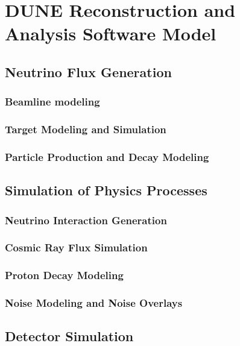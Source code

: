 %
\chapter{DUNE Reconstruction and Analysis Software Model } 
\section{Neutrino Flux Generation}
\subsection{Beamline modeling}
\subsection{Target Modeling and Simulation}
\subsection{Particle Production and Decay Modeling}
\section{Simulation of Physics Processes}
\subsection{Neutrino Interaction Generation}
\subsection{Cosmic Ray Flux Simulation}
\subsection{Proton Decay Modeling}
\subsection{Noise Modeling and Noise Overlays}
\section{Detector Simulation}
